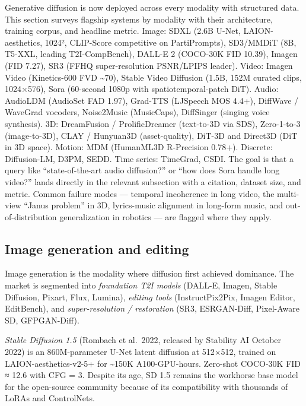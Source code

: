 Generative diffusion is now deployed across every modality with structured data. This section surveys flagship systems by modality with their architecture, training corpus, and headline metric. Image: SDXL (2.6B U-Net, LAION-aesthetics, 1024², CLIP-Score competitive on PartiPrompts), SD3/MMDiT (8B, T5-XXL, leading T2I-CompBench), DALL-E 2 (COCO-30K FID 10.39), Imagen (FID 7.27), SR3 (FFHQ super-resolution PSNR/LPIPS leader). Video: Imagen Video (Kinetics-600 FVD \textasciitilde70), Stable Video Diffusion (1.5B, 152M curated clips, 1024×576), Sora (60-second 1080p with spatiotemporal-patch DiT). Audio: AudioLDM (AudioSet FAD 1.97), Grad-TTS (LJSpeech MOS 4.4+), DiffWave / WaveGrad vocoders, Noise2Music (MusicCaps), DiffSinger (singing voice synthesis). 3D: DreamFusion / ProlificDreamer (text-to-3D via SDS), Zero-1-to-3 (image-to-3D), CLAY / Hunyuan3D (asset-quality), DiT-3D and Direct3D (DiT in 3D space). Motion: MDM (HumanML3D R-Precision 0.78+). Discrete: Diffusion-LM, D3PM, SEDD. Time series: TimeGrad, CSDI. The goal is that a query like ``state-of-the-art audio diffusion?'' or ``how does Sora handle long video?'' lands directly in the relevant subsection with a citation, dataset size, and metric. Common failure modes --- temporal incoherence in long video, the multi-view ``Janus problem'' in 3D, lyrics-music alignment in long-form music, and out-of-distribution generalization in robotics --- are flagged where they apply.

\subsection{Image generation and editing}\label{image-generation-and-editing}

Image generation is the modality where diffusion first achieved dominance. The market is segmented into \emph{foundation T2I models} (DALL-E, Imagen, Stable Diffusion, Pixart, Flux, Lumina), \emph{editing tools} (InstructPix2Pix, Imagen Editor, EditBench), and \emph{super-resolution / restoration} (SR3, ESRGAN-Diff, Pixel-Aware SD, GFPGAN-Diff).

\emph{Stable Diffusion 1.5} (Rombach et al.~2022, released by Stability AI October 2022) is an 860M-parameter U-Net latent diffusion at 512×512, trained on LAION-aesthetics-v2-5+ for \textasciitilde150K A100-GPU-hours. Zero-shot COCO-30K FID ≈ 12.6 with CFG = 3. Despite its age, SD 1.5 remains the workhorse base model for the open-source community because of its compatibility with thousands of LoRAs and ControlNets.

